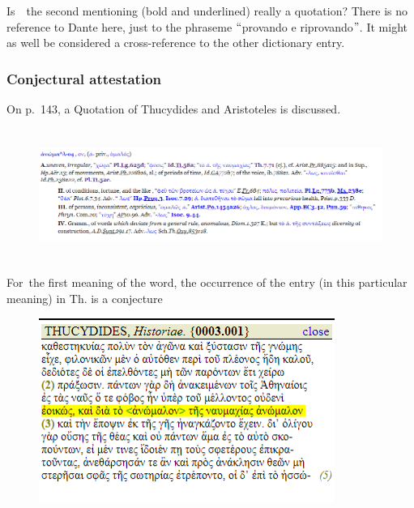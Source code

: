 \documentclass[10pt]{article}
\begin{document}
 Is\ \ the second mentioning (bold and underlined)  really a quotation? There is no reference to Dante here, just to the phraseme $``$provando e riprovando$"$. It might as well be considered a cross-reference to the other dictionary entry.\par



\subsubsection*{Conjectural attestation}
 On p.~143,  a Quotation of Thucydides and Aristoteles is discussed. \par








\begin{figure}[H]
\advance\leftskip 0.12in		\includegraphics[width=6.27in,height=1.69in]{./image13.png}
\end{figure}



\par

 For\ the first meaning of the word, the occurrence of the entry (in this particular meaning)  in Th. is a conjecture\par




\begin{figure}[H]
	\begin{Center}
		\includegraphics[width=3.8in,height=2.36in]{./image16.png}
	\end{Center}
\end{figure}
\end{document}
